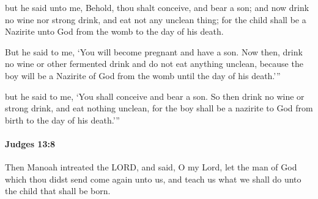 			\begin{versebox}
					\item[BHS] 
					\item[ASV] but he said unto me, Behold, thou shalt conceive, and bear a son; and now drink no wine nor strong drink, and eat not any unclean thing; for the child shall be a Nazirite unto God from the womb to the day of his death.
					\item[NIV] But he said to me, ‘You will become pregnant and have a son. Now then, drink no wine or other fermented drink and do not eat anything unclean, because the boy will be a Nazirite of God from the womb until the day of his death.’”
					\item[NRSV] but he said to me, ‘You shall conceive and bear a son. So then drink no wine or strong drink, and eat nothing unclean, for the boy shall be a nazirite to God from birth to the day of his death.’”
			\end{versebox}

		\paragraph{Judges 13:8} %
			\label{JUDGES-13-8}

			Then Manoah intreated the LORD, and said, O my Lord, let the man of God which thou didst send come again unto us, and teach us what we shall do unto the child that shall be born.

